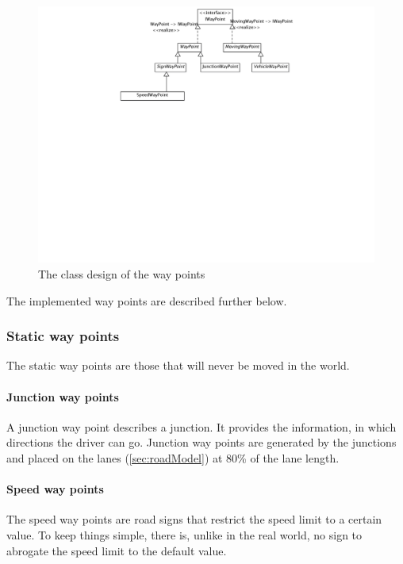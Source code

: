 \begin{figure}[htb]
\includegraphics[width=\textwidth]{images/waypoints.png}
\caption{The class design of the way points}
\label{fig:waypoints}
\end{figure}

The implemented way points are described further below.

\subsubsection{Static way points}

The static way points are those that will never be moved in the world.

\paragraph{Junction way points}
A junction way point describes a junction. It provides the information, in
which directions the driver can go. Junction way points are generated by the
junctions and placed on the lanes (\ref{sec:roadModel}) at 80\% of the lane
length.

\paragraph{Speed way points}
The speed way points are road signs that restrict the speed limit to a certain
value. To keep things simple, there is, unlike in the real world, no sign to 
abrogate the speed limit to the default value. \\

